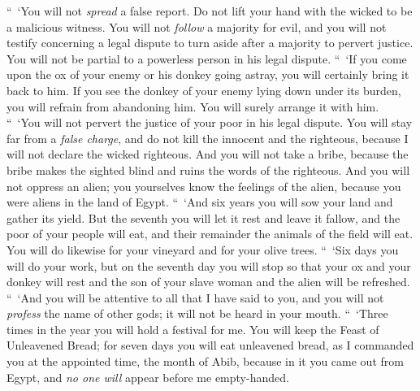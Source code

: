 \begin{biblechapter} %
 “ ‘You will not \textit{spread} a false report. Do not lift your hand with the wicked to be a malicious witness.
\verse You will not \textit{follow} a majority for evil, and you will not testify concerning a legal dispute to turn aside after a majority to pervert justice.
\verse You will not be partial to a powerless person in his legal dispute.
\verse “ ‘If you come upon the ox of your enemy or his donkey going astray, you will certainly bring it back to him.
\verse If you see the donkey of your enemy lying down under its burden, you will refrain from abandoning him. You will surely arrange it with him.
\verse “ ‘You will not pervert the justice of your poor in his legal dispute.
\verse You will stay far from a \textit{false charge}, and do not kill the innocent and the righteous, because I will not declare the wicked righteous.
\verse And you will not take a bribe, because the bribe makes the sighted blind and ruins the words of the righteous.
\verse And you will not oppress an alien; you yourselves know the feelings of the alien, because you were aliens in the land of Egypt.
 “ ‘And six years you will sow your land and gather its yield.
\verse But the seventh you will let it rest and leave it fallow, and the poor of your people will eat, and their remainder the animals of the field will eat. You will do likewise for your vineyard and for your olive trees.
\verse “ ‘Six days you will do your work, but on the seventh day you will stop so that your ox and your donkey will rest and the son of your slave woman and the alien will be refreshed.
\verse “ ‘And you will be attentive to all that I have said to you, and you will not \textit{profess} the name of other gods; it will not be heard in your mouth.
\verse “ ‘Three times in the year you will hold a festival for me.
\verse You will keep the Feast of Unleavened Bread; for seven days you will eat unleavened bread, as I commanded you at the appointed time, the month of Abib, because in it you came out from Egypt, and \textit{no one will} appear before me empty-handed.

\end{biblechapter}
